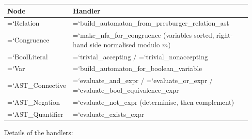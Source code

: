 \documentclass[10pt,a4paper]{article}
\newcommand{\code}[1]{{\small\ttfamily\hyphenchar\font=`\-\relax #1}}
\begin{document}
\begin{center}
\footnotesize
\begin{tabular}{ll}
\toprule
Node & Handler \\
\midrule
\code{Relation}        & \code{build\_\allowbreak automaton\_\allowbreak from\_\allowbreak presburger\_\allowbreak relation\_\allowbreak ast} \\
\code{Congruence}      & \code{make\_nfa\_for\_congruence} (variables sorted, right-hand side normalised modulo $m$) \\
\code{BoolLiteral}     & \code{trivial\_accepting} / \code{trivial\_nonaccepting} \\
\code{Var}             & \code{build\_\allowbreak automaton\_\allowbreak for\_\allowbreak boolean\_\allowbreak variable} \\
\code{AST\_Connective} & \code{evaluate\_and\_expr} / \code{evaluate\_or\_expr} / \code{evaluate\_bool\_equivalence\_expr} \\
\code{AST\_Negation}   & \code{evaluate\_not\_expr} (determinise, then complement) \\
\code{AST\_Quantifier} & \code{evaluate\_exists\_expr} \\
\bottomrule
\end{tabular}
\end{center}

Details of the handlers:
\end{document}
